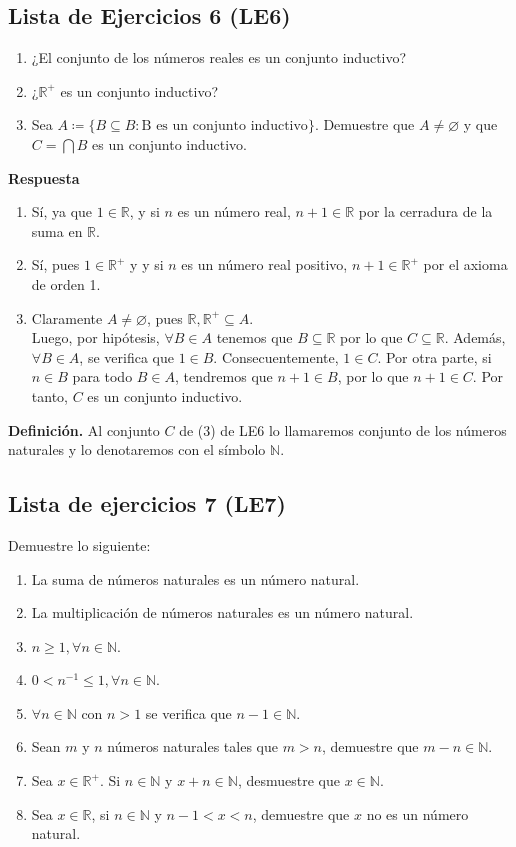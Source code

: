 \documentclass[11pt]{article}
\newcommand{\N}{\mathbb{N}}
\newcommand{\R}{\mathbb{R}}
\let\emptyset\varnothing
\begin{document}
\subsection*{Lista de Ejercicios 6 (LE6)}

\begin{enumerate}[label=\arabic*)]
    \item ¿El conjunto de los números reales es un conjunto inductivo?
    \item ¿$\R^+$ es un conjunto inductivo?
    \item Sea $A\coloneqq \{B \subseteq B: \text{B es un conjunto inductivo}\}$. Demuestre que $A\neq \emptyset$ y que $C=\bigcap B$ es un conjunto inductivo.
\end{enumerate}

\pagebreak

\textbf{Respuesta}

\begin{enumerate}[label=\arabic*)]
    \item Sí, ya que $1 \in \R$, y si $n$ es un número real, $n+1 \in \R$ por la cerradura de la suma en $\R$.
    \item Sí, pues $1\in \R^+$ y y si $n$ es un número real positivo, $n+1 \in \R^+$ por el axioma de orden 1.
    \item Claramente $A \neq \emptyset$, pues $\R, \R^+ \subseteq A$. \\[5pt]Luego, por hipótesis, $\forall B \in A$ tenemos que $B\subseteq \R $ por lo que $C\subseteq \R$. Además, $\forall B\in A$, se verifica que $1\in B$. Consecuentemente, $1\in C$. Por otra parte, si $n\in B$ para todo $B\in A$, tendremos que $n+1\in B$, por lo que $n+1 \in C$. Por tanto, $C$ es un conjunto inductivo.
\end{enumerate}

\textbf{Definición.} Al conjunto $C$ de (3) de LE6 lo llamaremos conjunto de los números naturales y lo denotaremos con el símbolo $\N$.

\subsection*{Lista de ejercicios 7 (LE7)}

Demuestre lo siguiente:

\begin{enumerate}[label=\alph*)]
    \item La suma de números naturales es un número natural.
    \item La multiplicación de números naturales es un número natural.
    \item $n\geq 1, \forall n\in \N$.
    \item $0<n^{-1}\leq 1, \forall n\in \N$.
    \item $\forall n\in \N$ con $n>1$ se verifica que $n-1\in \N$.
    \item Sean $m$ y $n$ números naturales tales que $m>n$, demuestre que $m-n\in\N$.
    \item Sea $x\in \R^+$. Si $n\in \N$ y $x+n\in \N$, desmuestre que $x\in \N$.
    \item Sea $x\in \R$, si $n\in \N$ y $n-1<x<n$, demuestre que $x$ no es un número natural.
\end{enumerate}
\end{document}
